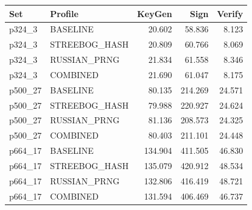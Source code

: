 \begin{tabular}{llrrr}
Set & Profile & KeyGen & Sign & Verify \\
\hline
p324\_3 & BASELINE & 20.602 & 58.836 & 8.123 \\
p324\_3 & STREEBOG\_HASH & 20.809 & 60.766 & 8.069 \\
p324\_3 & RUSSIAN\_PRNG & 21.834 & 61.558 & 8.346 \\
p324\_3 & COMBINED & 21.690 & 61.047 & 8.175 \\
p500\_27 & BASELINE & 80.135 & 214.269 & 24.571 \\
p500\_27 & STREEBOG\_HASH & 79.988 & 220.927 & 24.624 \\
p500\_27 & RUSSIAN\_PRNG & 81.136 & 208.573 & 24.325 \\
p500\_27 & COMBINED & 80.403 & 211.101 & 24.448 \\
p664\_17 & BASELINE & 134.904 & 411.505 & 46.830 \\
p664\_17 & STREEBOG\_HASH & 135.079 & 420.912 & 48.534 \\
p664\_17 & RUSSIAN\_PRNG & 132.806 & 416.419 & 48.721 \\
p664\_17 & COMBINED & 131.594 & 406.469 & 46.737 \\
\end{tabular}
